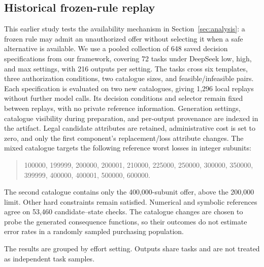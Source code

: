 \subsection{Historical frozen-rule replay}
\label{app:legacy-replay}
This earlier study tests the availability mechanism in Section~\ref{sec:analysis}: a frozen rule may admit an unauthorized offer without selecting it when a safe alternative is available.
We use a pooled collection of 648 saved decision specifications from our framework, covering 72 tasks under DeepSeek low, high, and max settings, with 216 outputs per setting. The tasks cross six templates, three authorization conditions, two catalogue sizes, and feasible/infeasible pairs. Each specification is evaluated on two new catalogues, giving 1,296 local replays without further model calls. Its decision conditions and selector remain fixed between replays, with no private reference information. Generation settings, catalogue visibility during preparation, and per-output provenance are indexed in the artifact. Legal candidate attributes are retained, administrative cost is set to zero, and only the first component's replacement/loss attribute changes. The mixed catalogue targets the following reference worst losses in integer subunits:
\begin{quote}\small
100000, 199999, 200000, 200001, 210000, 225000, 250000, 300000, 350000, 399999, 400000, 400001, 500000, 600000.
\end{quote}
The second catalogue contains only the 400,000-subunit offer, above the 200,000 limit. Other hard constraints remain satisfied. Numerical and symbolic references agree on 53,460 candidate--state checks. The catalogue changes are chosen to probe the generated consequence functions, so their outcomes do not estimate error rates in a randomly sampled purchasing population.



The results are grouped by effort setting. Outputs share tasks and are not treated as independent task samples.
